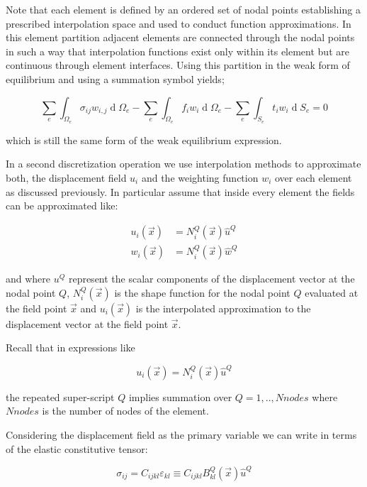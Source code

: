 Note that each element is defined by an ordered set of nodal points establishing a prescribed interpolation space and used to conduct function approximations. In this element partition adjacent elements are connected through the nodal points in such a way that interpolation functions exist only within its element but are continuous through element interfaces. Using this partition in the weak form of equilibrium and using a summation symbol yields;

\[\sum_e\int_{\Omega_e}\sigma_{ij}w_{i,j}\operatorname d\Omega_e-\sum_e\int_{\Omega_e}f_iw_i\operatorname d\Omega_e-\sum_e\int_{S_e}t_iw_i\operatorname dS_e = 0\]


which is still the same form of the weak equilibrium expression.

In a second discretization operation we use interpolation methods to approximate both, the displacement field $u_i$ and the weighting function $w_i$ over each element as discussed previously. In particular assume that inside every element the fields can be approximated like:


\begin{align*} 
u_i(\overrightarrow x)& =N_i^Q(\overrightarrow x)\widehat u^Q \\ 
w_i(\overrightarrow x)& =N_i^Q(\overrightarrow x)\widehat w^Q
\end{align*}

and where $u^Q$ represent the scalar components of the displacement vector at the nodal point $Q$, $N_i^Q(\overrightarrow x)$ is the shape function for the nodal point $Q$ evaluated at the field point $\overrightarrow x$ and $u_i(\overrightarrow x)$ is the interpolated approximation to the displacement vector at the field point $\overrightarrow x$.


\begin{tcolorbox}
Recall that in expressions like

\[u_i(\overrightarrow x) =N_i^Q(\overrightarrow x)\widehat u^Q\]

the repeated super-script $Q$ implies summation over $Q= 1,..,Nnodes$ where $Nnodes$ is the number of nodes of the element.


\end{tcolorbox}

Considering the displacement field as the primary variable we can write in terms of the elastic constitutive tensor:

\[\sigma_{ij}=C_{ijkl}\varepsilon_{kl}\equiv C_{ijkl}B_{kl}^Q(\overrightarrow x)\widehat u^Q\]

